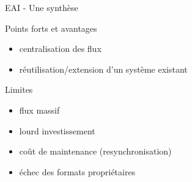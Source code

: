 \begin{frame}{EAI - Une synthèse}
  \begin{block}{Points forts et avantages}
    \begin{itemize}
      \item centralisation des flux
      \item réutilisation/extension d'un système existant
    \end{itemize}
  \end{block}

  \begin{block}{Limites}
    \begin{itemize}
      \item flux massif
      \item lourd investissement
      \item coût de maintenance (resynchronisation)
      \item échec des formats propriétaires
    \end{itemize}
  \end{block}
\end{frame}
